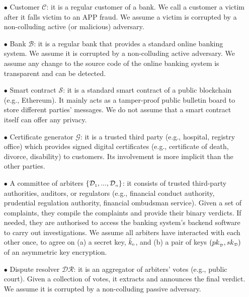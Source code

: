 \begin{itemize}
%
\item[$\bullet$] Customer $\mathcal{C}$: it is a regular customer of a bank. We call a customer  a victim after it falls victim to an APP fraud. We assume a victim is corrupted by a non-colluding active (or malicious) adversary. %
%
\item[$\bullet$] Bank $\mathcal{B}$: it is a regular bank that provides a standard online banking system. We assume it is corrupted by a non-colluding active adversary. We assume  any change to the source code of the online banking system is transparent and  can be detected. %
%
\item[$\bullet$] Smart contract $\mathcal{S}$: it is a standard  smart contract of a public  blockchain (e.g., Ethereum). It mainly acts as a tamper-proof public bulletin board to store different parties' messages.  We do not assume that a smart contract itself can offer any privacy. 
%
\item[$\bullet$] Certificate generator $\mathcal{G}$: it is a trusted third party (e.g., hospital, registry office) which provides signed digital certificates (e.g., certificate of death, divorce, disability) to customers. Its involvement is more implicit than the other  parties.
%
\item[$\bullet$]  A committee of arbiters $\{\mathcal{D}_{\scriptscriptstyle 1},..., \mathcal{D}_{\scriptscriptstyle n}\}$: it consists of  trusted third-party authorities, auditors, or regulators (e.g.,  financial conduct authority, prudential regulation authority, financial ombudsman service). Given a set of complaints, they compile the complaints    and provide  their binary verdicts. If needed, they are authorised to access the banking  system's backend software to carry out investigations. We assume all arbiters have interacted with each other once,  to agree on (a) a secret key, $\bar k_{\scriptscriptstyle 0}$, and (b) a pair of keys $({pk}_{\scriptscriptstyle\mathcal {D}}, {sk}_{\scriptscriptstyle\mathcal {D}})$  of an asymmetric key encryption.
%
\item[$\bullet$]  Dispute resolver $\mathcal{DR}$: it is an aggregator of arbiters' votes (e.g., public court). Given a collection of votes, it extracts and announces the final verdict. We assume it is corrupted by a non-colluding passive adversary. 
%
\end{itemize}



